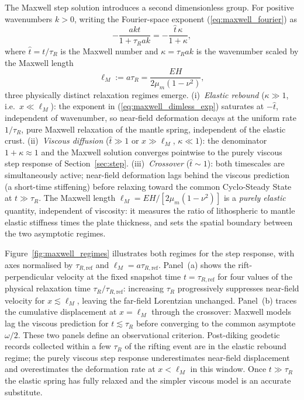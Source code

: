 \documentclass[12pt]{article}
\begin{document}
The Maxwell step solution introduces a second dimensionless group.  For
positive wavenumbers $k>0$, writing the Fourier-space exponent
(\ref{eq:maxwell_fourier}) as
\begin{equation}
-\frac{akt}{1+\tau_R ak}
= -\frac{\hat{t}\,\kappa}{1+\kappa},
\label{eq:maxwell_dimless_exp}
\end{equation}
where $\hat{t} = t/\tau_R$ is the Maxwell number and $\kappa = \tau_R ak$ is
the wavenumber scaled by the Maxwell length
\begin{equation}
\ell_M := a\tau_R = \frac{EH}{2\mu_m(1-\nu^2)},
\label{eq:maxwell_length}
\end{equation}
three physically distinct relaxation regimes emerge.
(i)~\emph{Elastic rebound} ($\kappa\gg 1$, i.e.\ $x\ll\ell_M$): the
exponent in (\ref{eq:maxwell_dimless_exp}) saturates at $-\hat{t}$,
independent of wavenumber, so near-field deformation decays at the uniform
rate $1/\tau_R$, pure Maxwell relaxation of the mantle spring,
independent of the elastic crust.
(ii)~\emph{Viscous diffusion} ($\hat{t}\gg 1$ or $x\gg\ell_M$, $\kappa\ll 1$):
the denominator $1+\kappa\approx 1$ and the Maxwell solution converges
pointwise to the purely viscous step response of
Section~\ref{sec:step}.
(iii)~\emph{Crossover} ($\hat{t}\sim 1$): both timescales are simultaneously
active; near-field deformation lags behind the viscous prediction (a
short-time stiffening) before relaxing toward the common Cyclo-Steady
State at $t\gg\tau_R$.
The Maxwell length $\ell_M = EH/[2\mu_m(1-\nu^2)]$ is a \emph{purely
elastic} quantity, independent of viscosity: it measures the ratio of
lithospheric to mantle elastic stiffness times the plate thickness, and
sets the spatial boundary between the two asymptotic regimes.

Figure~\ref{fig:maxwell_regimes} illustrates both regimes for the step
response, with axes normalised by $\tau_{R,\mathrm{ref}}$ and
$\ell_M = a\tau_{R,\mathrm{ref}}$.  Panel~(a) shows the rift-perpendicular
velocity at the fixed snapshot time $t = \tau_{R,\mathrm{ref}}$ for four
values of the physical relaxation time $\tau_R/\tau_{R,\mathrm{ref}}$:
increasing $\tau_R$ progressively
suppresses near-field velocity for $x \lesssim \ell_M$, leaving the
far-field Lorentzian unchanged.  Panel~(b) traces the cumulative
displacement at $x = \ell_M$ through the crossover: Maxwell models lag
the viscous prediction for $t \lesssim \tau_R$ before converging to the
common asymptote $\omega/2$.  These two panels define an observational
criterion.  Post-diking geodetic records collected within a few $\tau_R$
of the rifting event are in the elastic rebound regime; the purely viscous
step response underestimates near-field displacement and overestimates
the deformation rate at $x < \ell_M$ in this window.  Once $t \gg \tau_R$
the elastic spring has fully relaxed and the simpler viscous model is an
accurate substitute.
\end{document}
